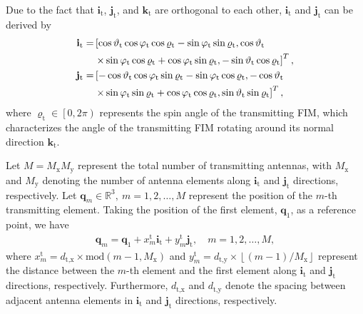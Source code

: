 \documentclass[lettersize,journal]{IEEEtran}
\begin{document}
Due to the fact that $\mathbf{i}_{\textrm{t}}$, $\mathbf{j}_{\textrm{t}}$, and $\mathbf{k}_{\textrm{t}}$ are orthogonal to each other, $\mathbf{i}_{\textrm{t}}$ and $\mathbf{j}_{\textrm{t}}$ can be derived by
\begin{align}
 \mathbf{i}_{\textrm{t}} =& \left [ \cos\vartheta_{\textrm{t}} \cos\varphi_{\textrm{t}} \cos\varrho_{\textrm{t}}-\sin\varphi_{\textrm{t}} \sin \varrho_{\textrm{t}}, \cos\vartheta_{\textrm{t}} \right. \notag\\
 & \left. \times \sin\varphi_{\textrm{t}} \cos\varrho_{\textrm{t}}+\cos\varphi_{\textrm{t}} \sin \varrho_{\textrm{t}}, -\sin\vartheta_{\textrm{t}} \cos\varrho_{\textrm{t}} \right ]^{T}, \label{eq2}\\
 \mathbf{j}_{\textrm{t}} =& \left [ -\cos\vartheta_{\textrm{t}} \cos\varphi_{\textrm{t}} \sin\varrho_{\textrm{t}}-\sin\varphi_{\textrm{t}} \cos\varrho_{\textrm{t}},-\cos\vartheta_{\textrm{t}} 
 \right. \notag\\
 & \left. \times \sin\varphi_{\textrm{t}} \sin\varrho_{\textrm{t}} +\cos\varphi_{\textrm{t}} \cos \varrho_{\textrm{t}}, \sin\vartheta_{\textrm{t}} \sin\varrho_{\textrm{t}} \right ]^{T}, \label{eq3}
\end{align}
where $\varrho_{\textrm{t}}\in \left [ 0,2\pi \right )$ represents the spin angle of the transmitting FIM, which characterizes the angle of the transmitting FIM rotating around its normal direction $\mathbf{k}_{\textrm{t}}$.


Let $M=M_{\textrm{x}}M_{\textrm{y}}$ represent the total number of transmitting antennas, with $M_{\textrm{x}}$ and $M_{\textrm{y}}$ denoting the number of antenna elements along $\mathbf{i}_{\textrm{t}}$ and $\mathbf{j}_{\textrm{t}}$ directions, respectively. Let $\mathbf{q}_{m}\in \mathbb{R}^{3},\ m=1,2,\ldots ,M$ represent the position of the $m$-th transmitting element. Taking the position of the first element, $\mathbf{q}_{1}$, as a reference point, we have
\begin{align}
 \mathbf{q}_{m} = \mathbf{q}_{1}+ x_{m}^{\textrm{t}}\mathbf{i}_{\textrm{t}}+y_{m}^{\textrm{t}}\mathbf{j}_{\textrm{t}},\quad m = 1,2,\ldots, M,
\end{align}
where $x_{m}^{\textrm{t}} = d_{\textrm{t},\textrm{x}}\times \textrm{mod}\left ( m-1,M_{\textrm{x}} \right )$ and $y_{m}^{\textrm{t}} = d_{\textrm{t}, \textrm{y}}\times \left \lfloor \left ( m-1 \right )/M_{\textrm{x}} \right \rfloor$ represent the distance between the $m$-th element and the first element along $\mathbf{i}_{\textrm{t}}$ and $\mathbf{j}_{\textrm{t}}$ directions, respectively. Furthermore, $d_{\textrm{t},\textrm{x}}$ and $d_{\textrm{t},\textrm{y}}$ denote the spacing between adjacent antenna elements in $\mathbf{i}_{\textrm{t}}$ and $\mathbf{j}_{\textrm{t}}$ directions, respectively.
\end{document}
